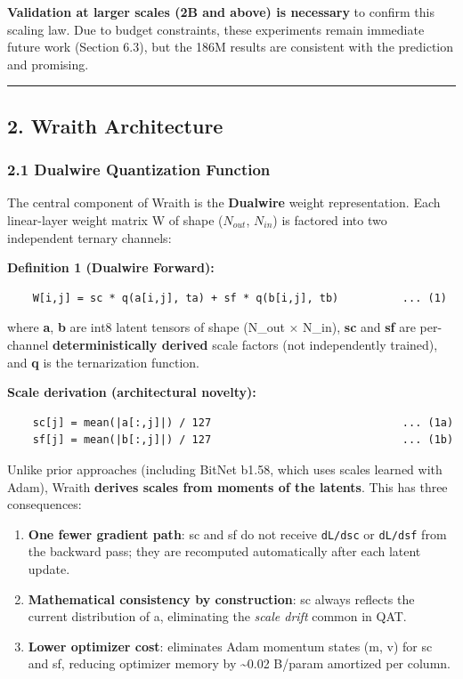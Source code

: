 \textbf{Validation at larger scales (2B and above) is necessary} to
confirm this scaling law. Due to budget constraints, these experiments
remain immediate future work (Section 6.3), but the 186M results are
consistent with the prediction and promising.

\begin{center}\rule{0.5\linewidth}{0.5pt}\end{center}

\subsection{2. Wraith Architecture}\label{wraith-architecture}

\subsubsection{2.1 Dualwire Quantization
Function}\label{dualwire-quantization-function}

The central component of Wraith is the \textbf{Dualwire} weight
representation. Each linear-layer weight matrix W of shape (\(N_{out}\),
\(N_{in}\)) is factored into two independent ternary channels:

\textbf{Definition 1 (Dualwire Forward):}

\begin{verbatim}
    W[i,j] = sc * q(a[i,j], ta) + sf * q(b[i,j], tb)          ... (1)
\end{verbatim}

where \textbf{a}, \textbf{b} are int8 latent tensors of shape (N\_out ×
N\_in), \textbf{sc} and \textbf{sf} are per-channel
\textbf{deterministically derived} scale factors (not independently
trained), and \textbf{q} is the ternarization function.

\textbf{Scale derivation (architectural novelty):}

\begin{verbatim}
    sc[j] = mean(|a[:,j]|) / 127                              ... (1a)
    sf[j] = mean(|b[:,j]|) / 127                              ... (1b)
\end{verbatim}

Unlike prior approaches (including BitNet b1.58, which uses scales
learned with Adam), Wraith \textbf{derives scales from moments of the
latents}. This has three consequences:

\begin{enumerate}
\def\labelenumi{\arabic{enumi}.}
\tightlist
\item
  \textbf{One fewer gradient path}: sc and sf do not receive
  \texttt{dL/dsc} or \texttt{dL/dsf} from the backward pass; they are
  recomputed automatically after each latent update.
\item
  \textbf{Mathematical consistency by construction}: sc always reflects
  the current distribution of \textbar a\textbar, eliminating the
  \emph{scale drift} common in QAT.
\item
  \textbf{Lower optimizer cost}: eliminates Adam momentum states (m, v)
  for sc and sf, reducing optimizer memory by \textasciitilde0.02
  B/param amortized per column.
\end{enumerate}

